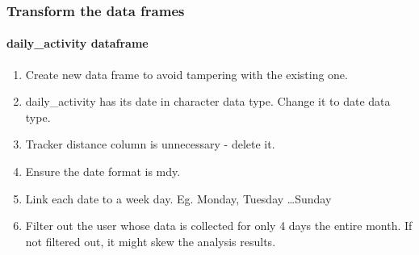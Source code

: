 \documentclass[
]{article}
\newenvironment{Shaded}{\begin{snugshade}}{\end{snugshade}}
\newcommand{\AttributeTok}[1]{\textcolor[rgb]{0.77,0.63,0.00}{#1}}
\newcommand{\ConstantTok}[1]{\textcolor[rgb]{0.00,0.00,0.00}{#1}}
\newcommand{\DecValTok}[1]{\textcolor[rgb]{0.00,0.00,0.81}{#1}}
\newcommand{\FunctionTok}[1]{\textcolor[rgb]{0.00,0.00,0.00}{#1}}
\newcommand{\NormalTok}[1]{#1}
\newcommand{\OtherTok}[1]{\textcolor[rgb]{0.56,0.35,0.01}{#1}}
\newcommand{\SpecialCharTok}[1]{\textcolor[rgb]{0.00,0.00,0.00}{#1}}
\begin{document}
\hypertarget{transform-the-data-frames}{%
\subsubsection{Transform the data
frames}\label{transform-the-data-frames}}

\hypertarget{daily_activity-dataframe}{%
\paragraph{daily\_activity dataframe}\label{daily_activity-dataframe}}

\begin{enumerate}
\def\labelenumi{\arabic{enumi}.}
\item
  Create new data frame to avoid tampering with the existing one.
\item
  daily\_activity has its date in character data type. Change it to date
  data type.
\item
  Tracker distance column is unnecessary - delete it.
\item
  Ensure the date format is mdy.
\item
  Link each date to a week day. Eg. Monday, Tuesday \ldots Sunday
\item
  Filter out the user whose data is collected for only 4 days the entire
  month. If not filtered out, it might skew the analysis results.
\end{enumerate}

\begin{Shaded}
\end{Shaded}
\end{document}
